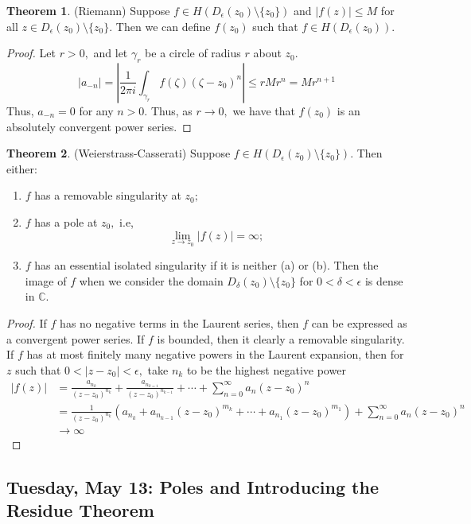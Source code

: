 \documentclass[10pt, oneside]{article}
\newcommand{\bbC}{\mathbb{C}}
\newcommand{\sm}{\setminus}
\theoremstyle{definition}
\newtheorem{thm}{Theorem}
\begin{document}
\begin{thm}
    (Riemann) Suppose $f \in H(D_{\epsilon}(z_0) \sm \{z_0\})$ and $|f(z)| \leq M$ for all $z \in D_{\epsilon}(z_0) \sm \{z_0\}.$ Then we can define $f(z_0)$ such that $f \in H(D_\epsilon(z_0)).$
\end{thm}
\begin{proof}
    Let $r>0,$ and let $\gamma_r$ be a circle of radius $r$ about $z_0.$ 
    \[|a_{-n}| = \left|\frac{1}{2\pi i}\int_{\gamma_r} f(\zeta)(\zeta - z_0)^n\right| \leq r M r ^n = Mr^{n+1}\] Thus, $a_{-n} = 0$ for any $n >0.$ Thus, as $r \to 0,$ we have that $f(z_0)$ is an absolutely convergent power series.
\end{proof}

\begin{thm}
    (Weierstrass-Casserati) Suppose $f\in H(D_\epsilon(z_0)\sm \{z_0\}).$ Then either:
    \begin{enumerate}
        \item $f$ has a removable singularity at $z_0;$
        \item $f$ has a pole at $z_0,$ i.e, 
        \[\lim_{z\to z_0}|f(z)| = \infty;\]
        \item $f$ has an essential isolated singularity if it is neither (a) or (b). Then the image of $f$ when we consider the domain $D_\delta(z_0) \sm \{z_0\}$ for $0 < \delta < \epsilon$ is dense in $\bbC.$
    \end{enumerate}
\end{thm}

\begin{proof}
    If $f$ has no negative terms in the Laurent series, then $f$ can be expressed as a convergent power series. If $f$ is bounded, then it clearly a removable singularity. If $f$ has at most finitely many negative powers in the Laurent expansion, then for $z$ such that $0 < |z - z_0| < \epsilon,$ take $n_k$ to be the highest negative power
    \begin{align*}
    |f(z)| &= \frac{a_{n_k}}{(z - z_0)^{n_k}} + \frac{a_{n_{k=1}}}{(z - z_0)^{n_{k-1}}} + \cdots+ \sum_{n=0}^\infty a_n (z - z_0)^n\\ &=  \frac{1}{(z - z_0)^{n_k}}\left(a_{n_k}+ a_{n_{k-1}}(z - z_0)^{m_k} + \cdots + a_{n_1}(z - z_0)^{m_1} \right) + \sum_{n=0}^\infty a_n (z - z_0)^n \\
    &\to \infty
    \end{align*}
\end{proof}

\newpage
\subsection{Tuesday, May 13: Poles and Introducing the Residue Theorem}
\end{document}
